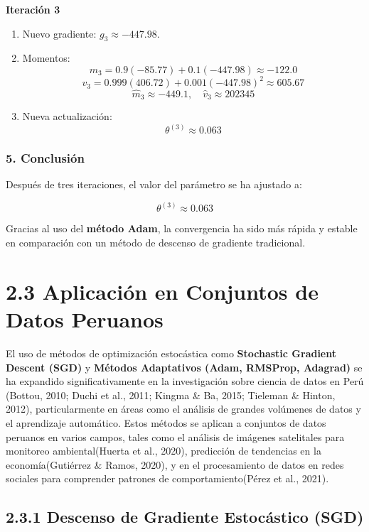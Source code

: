 \documentclass{article}
\begin{document}
\textbf{Iteración 3}

\begin{enumerate}
	\item Nuevo gradiente: \( g_3 \approx -447.98 \).
	\item Momentos:
	\[
	m_3 = 0.9(-85.77) + 0.1(-447.98) \approx -122.0
	\]
	\[
	v_3 = 0.999(406.72) + 0.001(-447.98)^2 \approx 605.67
	\]
	\[
	\hat{m}_3 \approx -449.1, \quad \hat{v}_3 \approx 202345
	\]
	
	\item Nueva actualización:
	\[
	\theta^{(3)} \approx 0.063
	\]
\end{enumerate}

\subsubsection*{5. Conclusión}

Después de tres iteraciones, el valor del parámetro se ha ajustado a:

\[
\theta^{(3)} \approx 0.063
\]

Gracias al uso del \textbf{método Adam}, la convergencia ha sido más rápida y estable en comparación con un método de descenso de gradiente tradicional.

	
	\section*{2.3 Aplicación en Conjuntos de Datos Peruanos}

El uso de métodos de optimización estocástica como \textbf{Stochastic Gradient Descent (SGD)} y \textbf{Métodos Adaptativos (Adam, RMSProp, Adagrad)} se ha expandido significativamente en la investigación sobre ciencia de datos en Perú (Bottou, 2010; Duchi et al., 2011; Kingma \& Ba, 2015; Tieleman \& Hinton, 2012), particularmente en áreas como el análisis de grandes volúmenes de datos y el aprendizaje automático. Estos métodos se aplican a conjuntos de datos peruanos en varios campos, tales como el análisis de imágenes satelitales para monitoreo ambiental(Huerta et al., 2020), predicción de tendencias en la economía(Gutiérrez \& Ramos, 2020), y en el procesamiento de datos en redes sociales para comprender patrones de comportamiento(Pérez et al., 2021).

\subsection*{2.3.1 Descenso de Gradiente Estocástico (SGD)}
\end{document}
